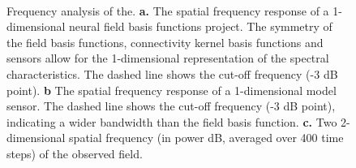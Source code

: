 \documentclass[twocolumn,11pt,a4paper]{article}		%
\begin{document}
\begin{figure}
	\label{fig:FreqAnalysis} 
	\begin{center}
\\
	\end{center}
	\caption{Frequency analysis of the. \textbf{a.} The spatial frequency response of a 1-dimensional neural field basis functions project. The symmetry of the field basis functions, connectivity kernel basis functions and sensors allow for the 1-dimensional representation of the spectral characteristics. The dashed line shows the cut-off frequency (-3 dB point). \textbf{b} The spatial frequency response of a 1-dimensional model sensor. The dashed line shows the cut-off frequency (-3 dB point), indicating a wider bandwidth than the field basis function. \textbf{c.} Two 2-dimensional spatial frequency (in power dB, averaged over 400 time steps) of the observed field.} 
\end{figure}
\end{document}
